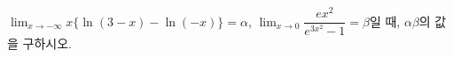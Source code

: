 $\displaystyle\lim_{x\to -\infty}x\{\ln(3-x)-\ln(-x)\}=\alpha$, $\displaystyle\lim_{x\to 0}\dfrac{ex^2}{e^{3x^2}-1}=\beta$일 때, $\alpha\beta$의 값을 구하시오.
